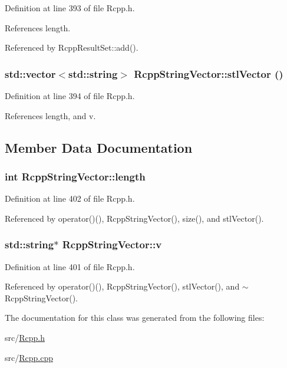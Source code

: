 Definition at line 393 of file Rcpp.h.

References length.

Referenced by RcppResultSet::add().\hypertarget{classRcppStringVector_2bd817c9332e1446ddf034938b256cc3}{
\subsubsection[{stlVector}]{\setlength{\rightskip}{0pt plus 5cm}std::vector$<$std::string$>$ RcppStringVector::stlVector ()}}
\label{classRcppStringVector_2bd817c9332e1446ddf034938b256cc3}




Definition at line 394 of file Rcpp.h.

References length, and v.

\subsection{Member Data Documentation}
\hypertarget{classRcppStringVector_aa2e2e4335d14e46fc96b07836e99573}{
\subsubsection[{length}]{\setlength{\rightskip}{0pt plus 5cm}int {\bf RcppStringVector::length}}}
\label{classRcppStringVector_aa2e2e4335d14e46fc96b07836e99573}




Definition at line 402 of file Rcpp.h.

Referenced by operator()(), RcppStringVector(), size(), and stlVector().\hypertarget{classRcppStringVector_94d14fa5093cc8219cbcb91aadfed09e}{
\subsubsection[{v}]{\setlength{\rightskip}{0pt plus 5cm}std::string$\ast$ {\bf RcppStringVector::v}}}
\label{classRcppStringVector_94d14fa5093cc8219cbcb91aadfed09e}




Definition at line 401 of file Rcpp.h.

Referenced by operator()(), RcppStringVector(), stlVector(), and $\sim$RcppStringVector().

The documentation for this class was generated from the following files:\begin{CompactItemize}
\item 
src/\hyperlink{Rcpp_8h}{Rcpp.h}\item 
src/\hyperlink{Rcpp_8cpp}{Rcpp.cpp}\end{CompactItemize}
